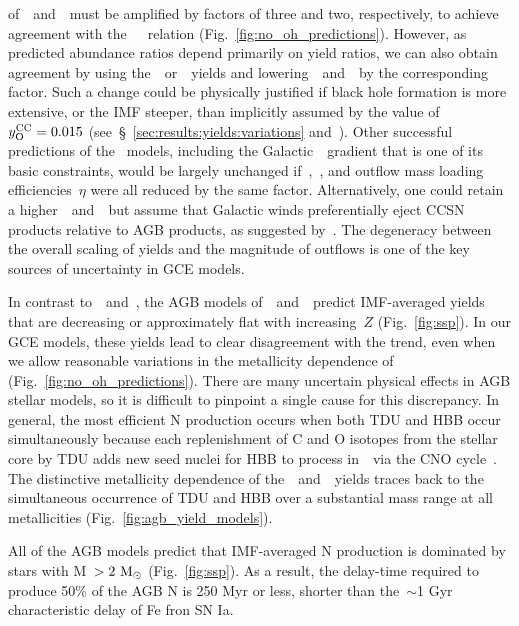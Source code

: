 \documentclass[ms.tex]{subfiles}
\begin{document}
of~\cristallo~and~\ventura~must be amplified by factors of three and two,
respectively, to achieve agreement with the~\citet{Dopita2016}~\ohno~relation
(Fig.~\ref{fig:no_oh_predictions}).
However, as predicted abundance ratios depend primarily on yield ratios, we can
also obtain agreement by using the~\cristallo~or~\ventura~yields and
lowering~~and~~by the corresponding factor.
Such a change could be physically justified if black hole formation is more
extensive, or the IMF steeper, than implicitly assumed by the value
of~$y_\text{O}^\text{CC} = 0.015$ (see~\S~\ref{sec:results:yields:variations}
and~\citealp{Griffith2021a}).
Other successful predictions of the~\citet{Johnson2021} models, including the
Galactic~\oh~gradient that is one of its basic constraints, would be largely
unchanged if~,~, and outflow mass loading efficiencies~$\eta$
were all reduced by the same factor.
Alternatively, one could retain a higher~~and~~but assume that
Galactic winds preferentially eject CCSN products relative to AGB products, as
suggested by~\citet{Vincenzo2016a}.
The degeneracy between the overall scaling of yields and the magnitude of
outflows is one of the key sources of uncertainty in GCE models.
\par
In contrast to~\cristallo~and~\ventura, the AGB models
of~\karakasten~and~\karakas~predict IMF-averaged yields that are decreasing or
approximately flat with increasing~$Z$ (Fig.~\ref{fig:ssp}).
In our GCE models, these yields lead to clear disagreement with the
\citet{Dopita2016} trend, even when we allow reasonable variations in the
metallicity dependence of~ (Fig.~\ref{fig:no_oh_predictions}).
There are many uncertain physical effects in AGB stellar models, so it is
difficult to pinpoint a single cause for this discrepancy.
In general, the most efficient N production occurs when both TDU and HBB occur
simultaneously because each replenishment of C and O isotopes from the stellar
core by TDU adds new seed nuclei for HBB to process in~\Nfourteen~via the CNO
cycle~\citep{Ventura2013}.
The distinctive metallicity dependence of the~\karakasten~and~\karakas~yields
traces back to the simultaneous occurrence of TDU and HBB over a substantial
mass range at all metallicities (Fig.~\ref{fig:agb_yield_models}).
\par
All of the AGB models predict that IMF-averaged N production is dominated by
stars with M~$> 2~\text{M}_\odot$ (Fig.~\ref{fig:ssp}).
As a result, the delay-time required to produce 50\% of the AGB N is 250 Myr or
less, shorter than the~$\sim$1 Gyr characteristic delay of Fe fron SN Ia.
\end{document}

